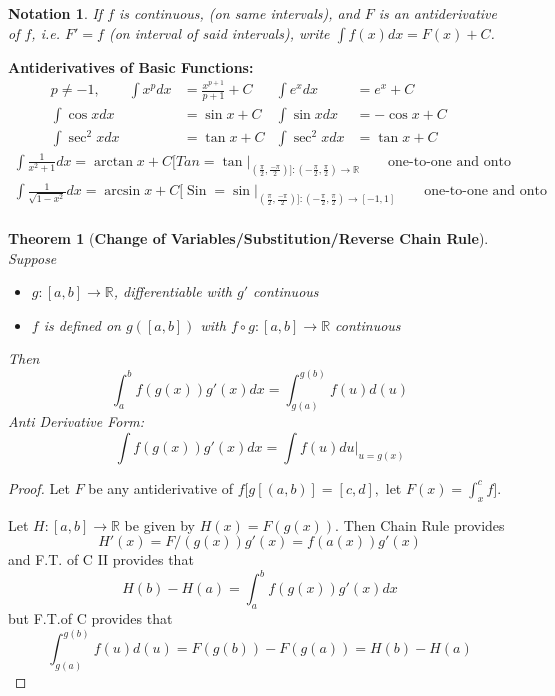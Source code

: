 \documentclass[12pt]{article}
\theoremstyle{plain}
\newtheorem{theorem}{Theorem}[subsection]
\newtheorem{notation}{Notation}[subsection]
\newcommand{\mR}{{\mathbb{R}}}
\DeclareMathOperator{\Sin}{Sin}
\begin{document}
	\begin{notation}
		If $f$ is continuous, (on same intervals), and $F$ is an antiderivative
		of $f$, i.e. $F' = f$ (on interval of said intervals), write 
		$\int f(x) dx = F(x) + C$.\\
	\end{notation}
	
	\textbf{Antiderivatives of Basic Functions: }
	\begin{align*}
		p\neq -1, \qquad \int x^p dx &= \frac{x^{p+1}}{p+1} + C & 
		\int e^x dx &= e^x + C & & \\
		\int \cos x dx &= \sin x + C
			& \int \sin x dx &= -\cos x + C\\
		\int \sec^2 x dx& = \tan x + C & \int \sec^2 x dx &= \tan x + C
	\end{align*}
	\begin{align*}
		\int \frac1{x^2+1}dx 
		= \arctan x + C
		[Tan = \tan\rvert_{(\frac{\pi}2, \frac{-\pi}2)]
			: (-\frac{\pi}2 , \frac{\pi}2)\to \mR}  \qquad 
			\text{one-to-one and onto}\\
		\int \frac1{\sqrt{1-x^2}}dx 
		= \arcsin x + C
		[\Sin = \sin\rvert_{(\frac{\pi}2, \frac{-\pi}2)]
		: (-\frac{\pi}2, \frac{\pi}2)\to [-1,1]}  \qquad 
			\text{one-to-one and onto}\\
	\end{align*}
	
		\begin{theorem}[\textbf{Change of Variables/Substitution/Reverse
		Chain Rule}]
		Suppose 
		\begin{itemize}
			\item $g:[a,b] \to \mR$, differentiable with $g'$ continuous
			\item $f$ is defined on $g([a,b])$ with $f \circ g : [a,b]
				\to \mR$ continuous
		\end{itemize}
		Then 
		\[
			\int_a^b f(g(x)) g'(x) dx = \int_{g(a)}^{g(b)} f(u)d(u)
		\]
		Anti Derivative Form:
		\[
			\int f(g(x)) g'(x) dx = \int f(u)du \vert_{u=g(x)}
		\]
	\end{theorem}
	\begin{proof}
		Let $F$ be any antiderivative of $f[g[(a,b)]=[c,d],$ let 
		$F(x) = \int_x^c f]$. 
		
		Let $H:[a,b] \to \mR$ be given by $H(x) = F(g(x))$. 
		Then Chain Rule provides 
		\[
			H'(x) = F/(g(x))g'(x) = f(a(x))g'(x)
		\]
		and F.T. of C II provides that 
		\[
			H(b) - H(a) = \int_a^b f(g(x))g'(x) dx
		\]
		but F.T.of C provides that 
		\[
			\int_{g(a)}^{g(b)} f(u)d(u) = F(g(b)) - F(g(a)) = H(b) - H(a)
		\]
	\end{proof}
\end{document}
